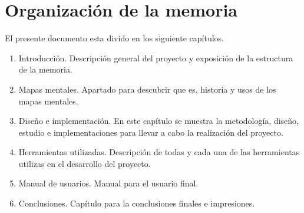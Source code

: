 \section{Organización de la memoria}

El presente documento esta divido en los siguiente capítulos.

\begin{enumerate}
\item Introducción. \newline
Descripción general del proyecto y exposición de la estructura de la memoria. 

\item Mapas mentales. \newline
Apartado para descubrir que es, historia y usos de los mapas mentales. 

\item Diseño e implementación. \newline
En este capítulo se muestra la metodología, diseño, estudio e implementaciones para llevar a cabo la realización del proyecto.  

\item Herramientas utilizadas. \newline
Descripción de todas y cada una de las herramientas utilizas en el desarrollo del proyecto.

\item Manual de usuarios. \newline
Manual para el usuario final. 

\item Conclusiones. \newline
Capítulo para la conclusiones finales e impresiones.

\end{enumerate}
